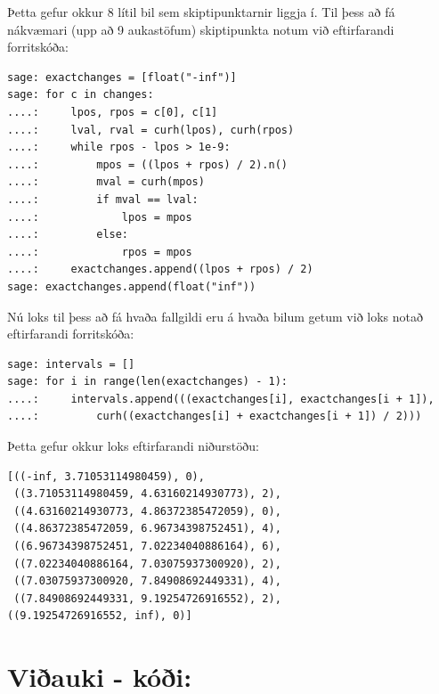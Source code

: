 \documentclass{article}
\begin{document}
\vspace*{0.5cm}

Þetta gefur okkur 8 lítil bil sem skiptipunktarnir liggja í. Til þess að fá nákvæmari (upp að 9 aukastöfum) skiptipunkta notum við eftirfarandi forritskóða: \\

\begin{verbatim}
sage: exactchanges = [float("-inf")]
sage: for c in changes:
....:     lpos, rpos = c[0], c[1]
....:     lval, rval = curh(lpos), curh(rpos)
....:     while rpos - lpos > 1e-9:
....:         mpos = ((lpos + rpos) / 2).n()
....:         mval = curh(mpos)
....:         if mval == lval:
....:             lpos = mpos
....:         else:
....:             rpos = mpos
....:     exactchanges.append((lpos + rpos) / 2)
sage: exactchanges.append(float("inf"))
\end{verbatim}

\vspace*{0.5cm}

Nú loks til þess að fá hvaða fallgildi eru á hvaða bilum getum við loks notað eftirfarandi forritskóða: \\

\begin{verbatim}
sage: intervals = []
sage: for i in range(len(exactchanges) - 1):
....:     intervals.append(((exactchanges[i], exactchanges[i + 1]), 
....:         curh((exactchanges[i] + exactchanges[i + 1]) / 2)))
\end{verbatim}

\vspace*{0.5cm}

Þetta gefur okkur loks eftirfarandi niðurstöðu: \\

\begin{verbatim}
[((-inf, 3.71053114980459), 0),
 ((3.71053114980459, 4.63160214930773), 2),
 ((4.63160214930773, 4.86372385472059), 0),
 ((4.86372385472059, 6.96734398752451), 4),
 ((6.96734398752451, 7.02234040886164), 6),
 ((7.02234040886164, 7.03075937300920), 2),
 ((7.03075937300920, 7.84908692449331), 4),
 ((7.84908692449331, 9.19254726916552), 2),
((9.19254726916552, inf), 0)]
\end{verbatim}

\section*{Viðauki - kóði:}
\end{document}
